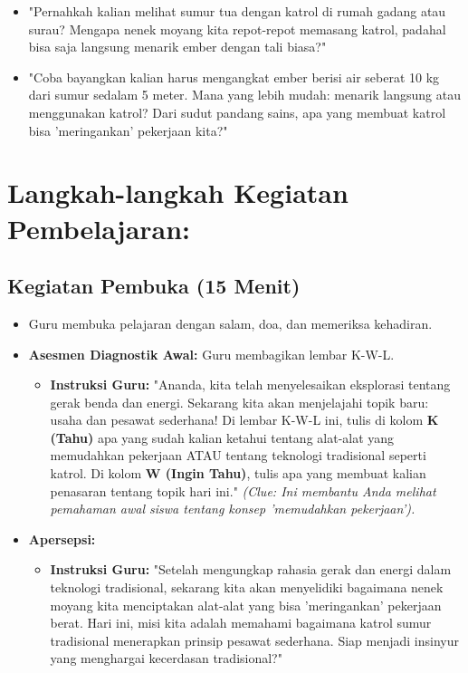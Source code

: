 \documentclass[a4paper,12pt]{article}
\begin{document}
\begin{itemize}
\item "Pernahkah kalian melihat sumur tua dengan katrol di rumah gadang atau surau? Mengapa nenek moyang kita repot-repot memasang katrol, padahal bisa saja langsung menarik ember dengan tali biasa?"
\item "Coba bayangkan kalian harus mengangkat ember berisi air seberat 10 kg dari sumur sedalam 5 meter. Mana yang lebih mudah: menarik langsung atau menggunakan katrol? Dari sudut pandang sains, apa yang membuat katrol bisa 'meringankan' pekerjaan kita?"
\end{itemize}

\section{Langkah-langkah Kegiatan Pembelajaran:}

\subsection{Kegiatan Pembuka (15 Menit)}
\begin{itemize}
\item Guru membuka pelajaran dengan salam, doa, dan memeriksa kehadiran.
\item \textbf{Asesmen Diagnostik Awal:} Guru membagikan lembar K-W-L.
    \begin{itemize}
    \item \textbf{Instruksi Guru:} "Ananda, kita telah menyelesaikan eksplorasi tentang gerak benda dan energi. Sekarang kita akan menjelajahi topik baru: usaha dan pesawat sederhana! Di lembar K-W-L ini, tulis di kolom \textbf{K (Tahu)} apa yang sudah kalian ketahui tentang alat-alat yang memudahkan pekerjaan ATAU tentang teknologi tradisional seperti katrol. Di kolom \textbf{W (Ingin Tahu)}, tulis apa yang membuat kalian penasaran tentang topik hari ini." \textit{(Clue: Ini membantu Anda melihat pemahaman awal siswa tentang konsep 'memudahkan pekerjaan').}
    \end{itemize}
\item \textbf{Apersepsi:}
    \begin{itemize}
    \item \textbf{Instruksi Guru:} "Setelah mengungkap rahasia gerak dan energi dalam teknologi tradisional, sekarang kita akan menyelidiki bagaimana nenek moyang kita menciptakan alat-alat yang bisa 'meringankan' pekerjaan berat. Hari ini, misi kita adalah memahami bagaimana katrol sumur tradisional menerapkan prinsip pesawat sederhana. Siap menjadi insinyur yang menghargai kecerdasan tradisional?"
    \end{itemize}
\end{itemize}
\end{document}
